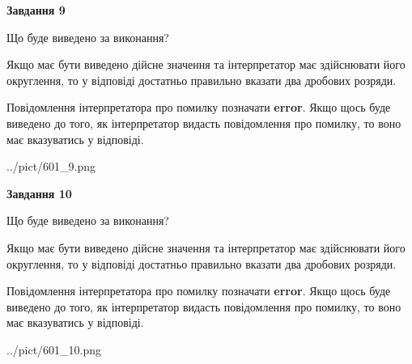 \documentclass[12pt, ukrainian]{article}
\begin{document}
{\begin {Large}
{\begin {center}\textbf{Завдання 9}\end {center}}\par
Що буде виведено за виконання? \par

Якщо має бути виведено дійсне значення та інтерпретатор має здійснювати його округлення, 
то у відповіді достатньо правильно вказати два дробових розряди.

Повідомлення інтерпретатора про помилку позначати \textbf{error}.
Якщо щось буде виведено до того, як інтерпретатор видасть повідомлення про помилку, 
то воно має вказуватись у відповіді. \par

\begin{center}
	{../pict/601_9.png}
\end{center}
\newpage

{\begin {center}\textbf{Завдання 10}\end {center}}\par
Що буде виведено за виконання? \par

Якщо має бути виведено дійсне значення та інтерпретатор має здійснювати його округлення, 
то у відповіді достатньо правильно вказати два дробових розряди.

Повідомлення інтерпретатора про помилку позначати \textbf{error}.
Якщо щось буде виведено до того, як інтерпретатор видасть повідомлення про помилку, 
то воно має вказуватись у відповіді. \par

\begin{center}
	{../pict/601_10.png}
\end{center}
\newpage

\end {Large}}
\end{document}
